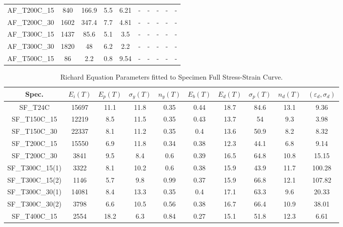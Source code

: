 \documentclass[review]{elsarticle}
\begin{document}
\begin{landscape}
\begin{table}[htbp]
\begin{tabular}{cccccccccc}
		AF\_T200C\_15 & 840   & 166.9 & 5.5   & 6.21  & -     & -     & -     & -     & - \\
		AF\_T200C\_30 & 1602  & 347.4 & 7.7   & 4.81  & -     & -     & -     & -     & - \\
		AF\_T300C\_15 & 1437  & 85.6  & 5.1   & 3.5   & -     & -     & -     & -     & - \\
		AF\_T300C\_30 & 1820  & 48    & 6.2   & 2.2   & -     & -     & -     & -     & - \\
		AF\_T500C\_15 & 86    & 2.2   & 0.8   & 9.54  & -     & -     & -     & -     & - \\
		\bottomrule
	\end{tabular}%
	\label{Tab3}%
\end{table}%


\begin{table}[htbp]
	\centering
	\caption{Richard Equation Parameters fitted to Specimen Full Stress-Strain Curve.}
	\begin{tabular}{cccccccccc}
		\toprule
		Spec. &  $E_i(T)$     &    $E_p(T)$   &   $\sigma_y(T)$    &   $n_y(T)$    &     $E_b(T)$   &    $E_d(T)$   &   $\sigma_p(T)$    &   $n_d(T)$    &  $(\varepsilon_d,\sigma_d)$\\
		\midrule
		SF\_T24C & 15697 & 11.1  & 11.8  & 0.35  & 0.44  & 18.7  & 84.6  & 13.1  & 9.36 \\
		SF\_T150C\_15 & 12219 & 8.5   & 11.5  & 0.35  & 0.43  & 13.7  & 54    & 9.3   & 3.98 \\
		SF\_T150C\_30 & 22337 & 8.1   & 11.2  & 0.35  & 0.4   & 13.6  & 50.9  & 8.2   & 8.32 \\
		SF\_T200C\_15 & 15550 & 6.9   & 11.8  & 0.34  & 0.38  & 12.3  & 44.1  & 6.8   & 9.14 \\
		SF\_T200C\_30 & 3841  & 9.5   & 8.4   & 0.6   & 0.39  & 16.5  & 64.8  & 10.8  & 15.15 \\
		SF\_T300C\_15(1) & 3322  & 8.1   & 10.2  & 0.6   & 0.38  & 15.9  & 43.9  & 11.7  & 100.28 \\
		SF\_T300C\_15(2) & 1146  & 5.7   & 9.8   & 0.99  & 0.37  & 15.9  & 66.8  & 12.1  & 107.82 \\
		SF\_T300C\_30(1) & 14081 & 8.4   & 13.3  & 0.35  & 0.4   & 17.1  & 63.3  & 9.6   & 20.33 \\
		SF\_T300C\_30(2) & 3798  & 6.6   & 10.5  & 0.56  & 0.38  & 16.7  & 66.4  & 10.9  & 38.01 \\
		SF\_T400C\_15 & 2554  & 18.2  & 6.3   & 0.84  & 0.27  & 15.1  & 51.8  & 12.3  & 6.61 \\

\end{tabular}
\end{table}
\end{landscape}
\end{document}
